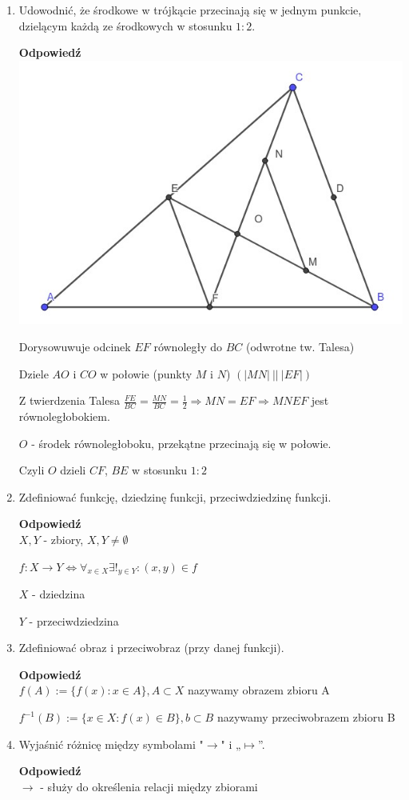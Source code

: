 \documentclass[12pt,a4paper]{article}
\theoremstyle{break}
\newcommand{\Odp}[1]{
		\begin{mdframed}[style=zadanie]
			\textbf{Odpowiedź}\\
			#1
		\end{mdframed}
	}
\begin{document}
\begin{enumerate}[1.]
{		Dwusieczne kątów $\angle ABC$ i $\angle ACB$ musza się przecinać.
	
		Wówczas $OO_B=OO_A \wedge OO_C=OO_A \Rightarrow OO_C=OO_B$, czyli jest to dwusieczna kąta $\angle BAC$ 
	}
	
	\item Udowodnić, że środkowe w trójkącie przecinają się w jednym punkcie, dzielącym każdą	ze środkowych w stosunku $1:2$.
	\Odp{
		\includegraphics[width=0.6\linewidth]{trj_proof_8.jpeg}
		
		Dorysowuwuje odcinek $EF$ równoległy do $BC$ (odwrotne tw. Talesa)
		
		Dziele $AO$ i $CO$ w połowie (punkty $M$ i $N$) $(|MN|\: ||\: |EF|)$
		
		Z twierdzenia Talesa $\frac{FE}{BC}=\frac{MN}{BC}=\frac{1}{2} \Rightarrow MN=EF \Rightarrow MNEF$ jest równoległobokiem.
		
		$O$ - środek równoległoboku, przekątne przecinają się w połowie.
		
		Czyli $O$ dzieli $CF$, $BE$ w stosunku $1:2$ 
	}
	
	\item Zdefiniować funkcję, dziedzinę funkcji, przeciwdziedzinę funkcji.
	\Odp{
		$X,Y$ - zbiory, $X,Y\neq \emptyset$
		
		$f:X\rightarrow Y \Leftrightarrow \forall_{x\in X} \exists!_{y\in Y}: (x,y)\in f$
		
		$X$ - dziedzina
		
		$Y$ - przeciwdziedzina
	}
	
	\item Zdefiniować obraz i przeciwobraz (przy danej funkcji).
	\Odp{
		$f(A):= \{f(x):x\in A\}, A\subset X$ nazywamy obrazem zbioru A
		
		$f^{-1}(B):= \{x\in X: f(x)\in B\}, b\subset B$ nazywamy przeciwobrazem zbioru B 
	}
	
	\item Wyjaśnić różnicę między symbolami "$\longrightarrow$" i „$\longmapsto$”.
	\Odp{
		$\longrightarrow$ - służy do określenia relacji między zbiorami
		
}
\end{enumerate}
\end{document}
